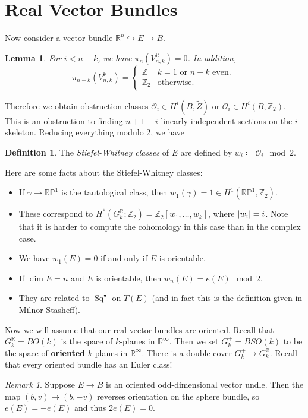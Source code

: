 \documentclass[leqno, openany]{memoir}
\newtheorem{lem}[thm]{Lemma}
\theoremstyle{definition}
\newtheorem{defn}[thm]{Definition}
\theoremstyle{remark}
\newtheorem{rmk}[thm]{Remark}
\theoremstyle{plain}
\theoremstyle{definition}
\theoremstyle{remark}
\newcommand{\R}{\mathbb{R}}
\newcommand{\Z}{\mathbb{Z}}
\renewcommand{\P}{\mathbb{P}}
\newcommand{\mc}[1]{\mathcal{#1}}
\newcommand{\wt}[1]{\widetilde{#1}}
\DeclareMathOperator{\Sq}{Sq}
\begin{document}
\section{Real Vector Bundles}%
\label{sec:real_vector_bundles}

Now consider a vector bundle $\R^n \hookrightarrow E \to B$.

\begin{lem}
    For $i < n-k$, we have $\pi_n(V_{n,k}^{\R}) = 0$. In addition, 
    \[ \pi_{n-k}(V_{n,k}^{\R}) = \begin{cases}
        \Z & k=1 \text{ or } n-k \text{ even. } \\
        \Z_2 & \text{otherwise}.
    \end{cases} \]
\end{lem}
Therefore we obtain obstruction classes $\mc{O}_i \in H^i(B, \wt{Z})$ or $\mc{O}_i \in H^i(B, \Z_2)$. This is an obstruction to finding $n+1-i$ linearly independent sections on the $i$-skeleton. Reducing everything modulo $2$, we have
\begin{defn}
    The \textit{Stiefel-Whitney classes} of $E$ are defined by $w_i \coloneqq \mc{O}_i \mod 2$.
\end{defn}
Here are some facts about the Stiefel-Whitney classes:
\begin{itemize}
    \item If $\gamma \to \R\P^1$ is the tautological class, then $w_1(\gamma) = 1 \in H^1(\R\P^1, \Z_2)$.
    \item These correspond to $H^*(G_k^{\R}; \Z_2) = \Z_2[w_1, \ldots, w_k]$, where $\abs{w_i} = i$. Note that it is harder to compute the cohomology in this case than in the complex case.
    \item We have $w_1(E) = 0$ if and only if $E$ is orientable.
    \item If $\dim E = n$ and $E$ is orientable, then $w_n(E) = e(E) \mod 2$.
    \item They are related to $\Sq^{\bullet}$ on $T(E)$ (and in fact this is the definition given in Milnor-Stasheff).
\end{itemize}

Now we will assume that our real vector bundles are oriented. Recall that $G_k^{\R} = BO(k)$ is the space of $k$-planes in $\R^{\infty}$. Then we set $G_k^+ = BSO(k)$ to be the space of \textbf{oriented} $k$-planes in $\R^{\infty}$. There is a double cover $G_k^+ \to G_k^{\R}$. Recall that every oriented bundle has an Euler class!
\begin{rmk}
    Suppose $E \to B$ is an oriented odd-dimensional vector undle. Then the map $(b, v) \mapsto (b,-v)$ reverses orientation on the sphere bundle, so $e(E) = -e(E)$ and thus $2e(E) = 0$.
\end{rmk}
\end{document}
